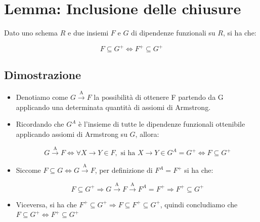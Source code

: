 \documentclass{article}
\begin{document}
\pagebreak
\section{Lemma: Inclusione delle chiusure}
Dato uno schema $R$ e due insiemi $F$ e $G$ di dipendenze funzionali su $R$, si ha che:\par 

\[F \subseteq G^+ \Leftrightarrow F^+ \subseteq G^+\]

\subsection{Dimostrazione}
\begin{itemize}
  \item Denotiamo come $G \xrightarrow{\text{A}} F$ la possibilità di ottenere F partendo da G applicando una determinata quantità di assiomi di Armstrong.
  \item  Ricordando che $G^A$ è l'insieme di tutte le dipendenze funzionali ottenibile applicando assiomi di Armstrong su $G$, allora:\par

  \[G \xrightarrow{\text{A}} F \Leftrightarrow \forall X \rightarrow Y \in F, \text{ si ha } X \rightarrow Y \in G^A = G^+ \Leftrightarrow F \subseteq G^+\]

  \item Siccome $F \subseteq G \Leftrightarrow G \xrightarrow{\text{A}} F$, per definizione di $F^A = F^+$ si ha che:

  \[F \subseteq G^+ \Rightarrow G \xrightarrow{\text{A}} F \xrightarrow{\text{A}} F^A = F^+ \Rightarrow F^+ \subseteq G^+\]
  \item Viceversa, si ha che $F^+ \subseteq G^+ \Rightarrow F \subseteq F^+ \subseteq G^+$, quindi concludiamo che $F \subseteq G^+ \Leftrightarrow F^+ \subseteq G^+$

\end{itemize}







\pagebreak
\end{document}
